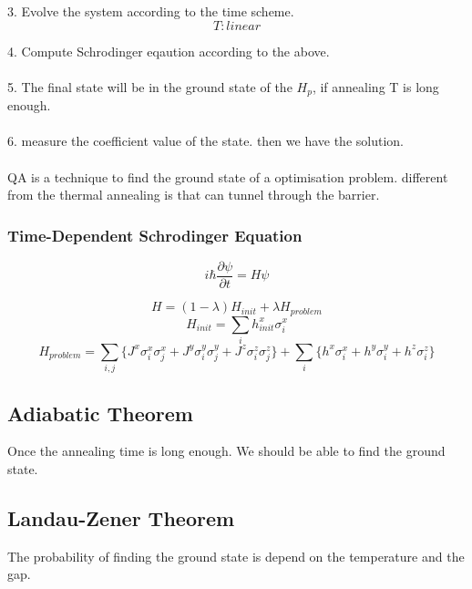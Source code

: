 \documentclass[twoside,a4paper,article]{combine}
\begin{document}
3. Evolve the system according to the time scheme.
\begin{equation*}
	T:linear 
\end{equation*}

4. Compute Schrodinger eqaution according to the above.\\
\\
5. The final state will be in the ground state of the $H_p$, if annealing T is long enough.\\
\\
6. measure the coefficient value of the state. then we have the solution.\\
\\



QA is a technique to find the ground state of a optimisation problem. different from the thermal annealing is that can tunnel through the barrier. 


\subsubsection{Time-Dependent Schrodinger Equation}
\begin{equation*}
i\hbar\frac{\partial \psi}{\partial t}=H\psi
\end{equation*}

\begin{equation*}
H=(1-\lambda)H_{init}+\lambda H_{problem}
\end{equation*}
\begin{equation*}
H_{init}=\sum_{i} h^x_{init} \sigma^x_i
\end{equation*}
\begin{equation*}
H_{problem}=\sum_{i,j} \{J^x \sigma^x_i \sigma^x_j+J^y \sigma^y_i \sigma^y_j+J^z \sigma^z_i \sigma^z_j \}+ \sum_{i} \{h^x \sigma^x_i+h^y \sigma^y_i+h^z \sigma^z_i\}
\end{equation*}

\subsection{Adiabatic Theorem}
Once the annealing time is long enough. We should be able to find the ground state.
\subsection{Landau-Zener Theorem}
The probability of finding the ground state is depend on the temperature and the gap.
\end{document}
